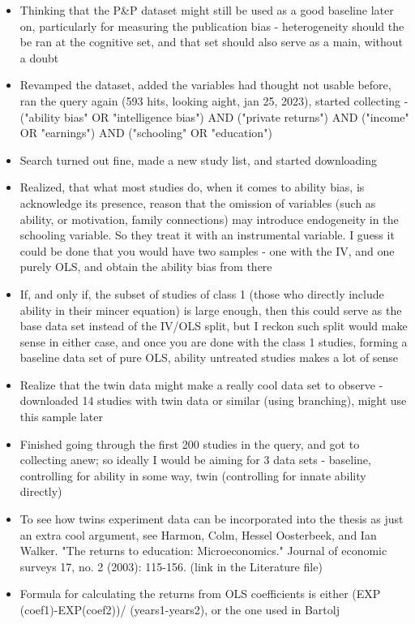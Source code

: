 \begin{itemize}
    \item Thinking that the P\&P dataset might still be used as a good baseline later on, particularly for measuring the publication bias - heterogeneity should the be ran at the cognitive set, and that set should also serve as a main, without a doubt
    \item Revamped the dataset, added the variables had thought not usable before, ran the query again (593 hits, looking aight, jan 25, 2023), started collecting - ("ability bias" OR "intelligence bias") AND ("private returns") AND ("income" OR "earnings") AND ("schooling" OR "education") 
    \item Search turned out fine, made a new study list, and started downloading
    \item Realized, that what most studies do, when it comes to ability bias, is acknowledge its presence, reason that the omission of variables (such as ability, or motivation, family connections) may introduce endogeneity in the schooling variable. So they treat it with an instrumental variable. I guess it could be done that you would have two samples - one with the IV, and one purely OLS, and obtain the ability bias from there
    \item If, and only if, the subset of studies of class 1 (those who directly include ability in their mincer equation) is large enough, then this could serve as the base data set instead of the IV/OLS split, but I reckon such split would make sense in either case, and once you are done with the class 1 studies, forming a baseline data set of pure OLS, ability untreated studies makes a lot of sense
    \item Realize that the twin data might make a really cool data set to observe - downloaded 14 studies with twin data or similar (using branching), might use this sample later
    \item Finished going through the first 200 studies in the query, and got to collecting anew; so ideally I would be aiming for 3 data sets - baseline, controlling for ability in some way, twin (controlling for innate ability directly)
    \item To see how twins experiment data can be incorporated into the thesis as just an extra cool argument, see
    Harmon, Colm, Hessel Oosterbeek, and Ian Walker. "The returns to education: Microeconomics." Journal of economic surveys 17, no. 2 (2003): 115-156. (link in the Literature file)
    \item Formula for calculating the returns from OLS coefficients is either (EXP (coef1)-EXP(coef2))/ (years1-years2), or the one used in Bartolj

\end{itemize}

